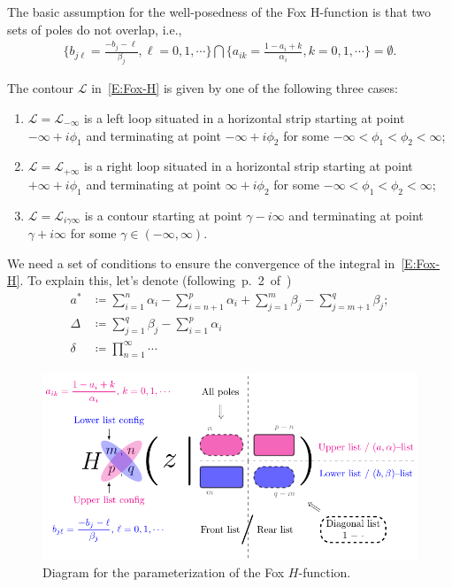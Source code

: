 \documentclass[11pt]{article}
\begin{document}
The basic assumption for the well-posedness of the Fox H-function is that two
sets of poles do not overlap, i.e.,
\begin{align}\label{E:poles}
  \bigg\{b_{j\ell}=\frac{-b_j-\ell}{\beta_j },  \ell =0, 1, \cdots\bigg\} \bigcap
  \bigg\{a_{ik}   =\frac{1-a_i + k}{\alpha_i},  k=0, 1,     \cdots\bigg\} = \emptyset.
\end{align}

The contour $\mathcal{L}$ in~\eqref{E:Fox-H} is given by one of the following
three cases:
\begin{enumerate}

  \item $\mathcal{L}=\mathcal{L}_{-\infty}$ is a left loop situated in a
    horizontal strip starting at point $-\infty+i\phi_1$ and terminating at
    point $-\infty+i\phi_2$ for some $-\infty<\phi_1< \phi_2<\infty$;

  \item $\mathcal{L}=\mathcal{L}_{+\infty}$ is a right loop situated in a
    horizontal strip starting at point $+\infty+i\phi_1$ and terminating at
    point $\infty+i\phi_2$ for some $-\infty<\phi_1< \phi_2<\infty$;

  \item $\mathcal{L}=\mathcal{L}_{i\gamma\infty}$ is a contour starting at point
    $\gamma-i\infty$ and terminating at point $\gamma+i\infty$ for some
    $\gamma\in(-\infty, \infty)$.

\end{enumerate}

We need a set of conditions to ensure the convergence of the integral
in~\eqref{E:Fox-H}. To explain this, let's denote
(following~p.~2~of~\cite{kilbas.saigo:04:h-transforms})
\begin{align*}
  a^*    & \coloneqq\sum_{i=1}^n \alpha_i -\sum_{i=n+1}^p\alpha_i+\sum_{j=1}^m\beta_j-\sum_{j=m+1}^{q}\beta_j; \\
  \Delta & \coloneqq \sum_{j=1}^q\beta_j-\sum_{i=1}^p\alpha_i \\
  \delta & \coloneqq \prod_{n=1 }^{\infty} \cdots
\end{align*}
\begin{figure}[htp]
  \centering
  \includegraphics[width=1.0\textwidth]{./FoxH-Diagram.pdf}
  \caption{Diagram for the parameterization of the Fox $H$-function.}
  \label{F:Diagram}
\end{figure}









 
\end{document}
